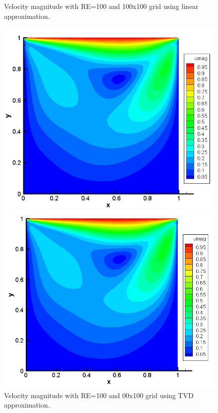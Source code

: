 \documentclass[12pt]{elsarticle}
\begin{document}
	\begin{figure}[h]
		\caption{Velocity magnitude with RE=100 and 100x100 grid using linear approximation. }
		\centering\includegraphics[width=0.9\linewidth]{7_100_100_re_100_velocity_linear}
		\caption{Velocity magnitude with RE=100 and 00x100 grid using TVD approximation. }
		\centering\includegraphics[width=0.9\linewidth]{8_100_100_re_100_velocity_tvd}
	\end{figure}
	
\end{document}
